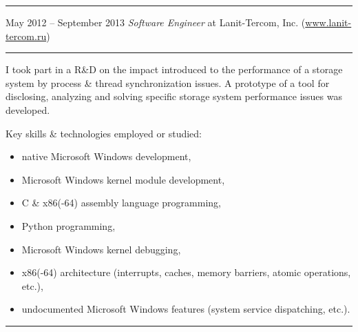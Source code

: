 \documentclass[11pt]{article}
\newcommand\CvSmallSkipLength{0.5em}
\newcommand\CvBigSkipLength{1em}
\newcommand\CvSkip[1]{\vspace{#1}}
\newcommand\CvSmallSkip{\CvSkip{\CvSmallSkipLength}}
\newcommand\CvBigSkip{\CvSkip{\CvBigSkipLength}}
\newcommand\CvSectionHeader[1]{\CvBigSkip\textbf{#1}\CvBigSkip}
\newcommand\CvRule{\begingroup\color{CvRuleColor}\hrule\endgroup}
\newcommand\CvWorkplaceHeader[5]{\begingroup%
  \CvRule%
  \fboxsep0pt%
  \colorbox{CvWorkplaceHeaderColor}{%
    \begin{minipage}{\linewidth-2\fboxsep}%
\CvSmallSkip%
#1 -- #2 \hfill \textit{#3} at #4 (\href{http://#5/}{#5})%
\CvSmallSkip%
    \end{minipage}%
  }%
  \CvRule%
\endgroup%
}
\newenvironment{CvWorkplaceDescription}{%
    \begingroup\setlength\parskip{\CvSmallSkipLength}%
  }{%
    \CvSmallSkip\endgroup%
  }
\begin{document}
\CvWorkplaceHeader{May 2012}{September 2013}{Software Engineer}{Lanit-Tercom, Inc.}{www.lanit-tercom.ru}

\begin{CvWorkplaceDescription}
I took part in a R\&D on the impact introduced to the performance of a storage
system by process \& thread synchronization issues.
A prototype of a tool for disclosing, analyzing and solving specific storage
system performance issues was developed.

Key skills \& technologies employed or studied:
\begin{itemize}[noitemsep]
  \item native Microsoft Windows development,
  \item Microsoft Windows kernel module development,
  \item C \& x86(-64) assembly language programming,
  \item Python programming,
  \item Microsoft Windows kernel debugging,
  \item x86(-64) architecture (interrupts, caches, memory barriers, atomic
  operations, etc.),
  \item undocumented Microsoft Windows features (system service dispatching,
etc.).
\end{itemize}
\end{CvWorkplaceDescription}
\CvRule



\end{document}
